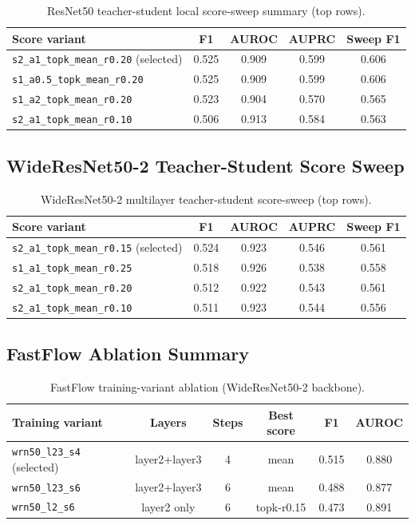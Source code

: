 \documentclass[11pt]{article}
\begin{document}
\begin{table}[H]
\centering
\caption{ResNet50 teacher-student local score-sweep summary (top rows).}
\label{tab:appendix_ts_resnet50}
\begin{tabular}{lcccc}
\toprule
Score variant & F1 & AUROC & AUPRC & Sweep F1 \\
\midrule
\texttt{s2\_a1\_topk\_mean\_r0.20} (selected) & 0.525 & 0.909 & 0.599 & 0.606 \\
\texttt{s1\_a0.5\_topk\_mean\_r0.20}           & 0.525 & 0.909 & 0.599 & 0.606 \\
\texttt{s1\_a2\_topk\_mean\_r0.20}             & 0.523 & 0.904 & 0.570 & 0.565 \\
\texttt{s2\_a1\_topk\_mean\_r0.10}             & 0.506 & 0.913 & 0.584 & 0.563 \\
\bottomrule
\end{tabular}
\end{table}

\subsection{WideResNet50-2 Teacher-Student Score Sweep}

\begin{table}[H]
\centering
\caption{WideResNet50-2 multilayer teacher-student score-sweep (top rows).}
\label{tab:appendix_ts_wrn}
\begin{tabular}{lcccc}
\toprule
Score variant & F1 & AUROC & AUPRC & Sweep F1 \\
\midrule
\texttt{s2\_a1\_topk\_mean\_r0.15} (selected) & 0.524 & 0.923 & 0.546 & 0.561 \\
\texttt{s1\_a1\_topk\_mean\_r0.25}             & 0.518 & 0.926 & 0.538 & 0.558 \\
\texttt{s2\_a1\_topk\_mean\_r0.20}             & 0.512 & 0.922 & 0.543 & 0.561 \\
\texttt{s2\_a1\_topk\_mean\_r0.10}             & 0.511 & 0.923 & 0.544 & 0.556 \\
\bottomrule
\end{tabular}
\end{table}

\subsection{FastFlow Ablation Summary}

\begin{table}[H]
\centering
\caption{FastFlow training-variant ablation (WideResNet50-2 backbone).}
\label{tab:appendix_fastflow}
\begin{tabular}{lccccc}
\toprule
Training variant & Layers & Steps & Best score & F1 & AUROC \\
\midrule
\texttt{wrn50\_l23\_s4} (selected) & layer2+layer3 & 4 & mean       & 0.515 & 0.880 \\
\texttt{wrn50\_l23\_s6}            & layer2+layer3 & 6 & mean       & 0.488 & 0.877 \\
\texttt{wrn50\_l2\_s6}             & layer2 only   & 6 & topk-r0.15 & 0.473 & 0.891 \\
\bottomrule
\end{tabular}
\end{table}
\end{document}

